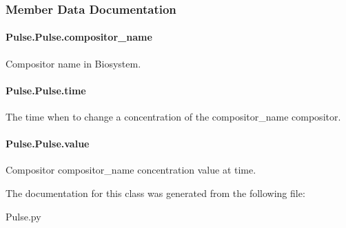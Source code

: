 \subsubsection{Member Data Documentation}
\paragraph[{\texorpdfstring{compositor\+\_\+name}{compositor_name}}]{\setlength{\rightskip}{0pt plus 5cm}Pulse.\+Pulse.\+compositor\+\_\+name}\hypertarget{classPulse_1_1Pulse_a85e4ce2663aa009215a67b5c905dd92d}{}\label{classPulse_1_1Pulse_a85e4ce2663aa009215a67b5c905dd92d}


Compositor name in Biosystem. 

\paragraph[{\texorpdfstring{time}{time}}]{\setlength{\rightskip}{0pt plus 5cm}Pulse.\+Pulse.\+time}\hypertarget{classPulse_1_1Pulse_a092f89ee6ae7619b6bdc7c3d3dccc2d7}{}\label{classPulse_1_1Pulse_a092f89ee6ae7619b6bdc7c3d3dccc2d7}


The time when to change a concentration of the {\ttfamily compositor\+\_\+name} compositor. 

\paragraph[{\texorpdfstring{value}{value}}]{\setlength{\rightskip}{0pt plus 5cm}Pulse.\+Pulse.\+value}\hypertarget{classPulse_1_1Pulse_a4b3625886587f786b4e31e07fde48140}{}\label{classPulse_1_1Pulse_a4b3625886587f786b4e31e07fde48140}


Compositor {\ttfamily compositor\+\_\+name} concentration value at {\ttfamily time}. 



The documentation for this class was generated from the following file\+:\begin{DoxyCompactItemize}
\item 
Pulse.\+py\end{DoxyCompactItemize}
